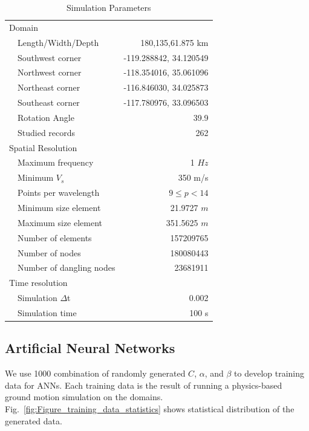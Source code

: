 \begin{table}[ht]
\centering
\caption{Simulation Parameters}
\label{tab:sim_param}
\renewcommand{\arraystretch}{0.75}
\begin{tabular}{lr}
\\ \hline
Domain                              &                              \\
~~Length/Width/Depth       & 180,135,61.875 km \\
~~Southwest corner          & -119.288842, 34.120549             \\
~~Northwest corner           & -118.354016, 35.061096             \\
~~Northeast corner            & -116.846030, 34.025873              \\
~~Southeast corner           & -117.780976, 33.096503               \\
~~Rotation Angle               & 39.9 \\
~~Studied records             & 262 \\
Spatial Resolution              &    \\
~~Maximum frequency     & 1 $Hz$ \\
~~Minimum $V_s$            & 350 m/s \\
~~Points per wavelength   & $9\leq p < 14$\\
~~Minimum size element   & 21.9727 $m$\\
~~Maximum size element   & 351.5625 $m$\\
~~Number of elements       & 157209765 \\
~~Number of nodes            & 180080443 \\
~~Number of dangling nodes & 23681911 \\
Time resolution  & \\
~~Simulation $\Delta$t & 0.002 \\
~~Simulation time & 100 s\\ \hline
\end{tabular}
\end{table}

\subsection{Artificial Neural Networks}

We use 1000 combination of randomly generated $C$, $\alpha$, and $\beta$ to develop training data for ANNs. Each training data is the result of running a physics-based ground motion simulation on the domains. Fig.~\ref{fig:Figure_training_data_statistics} shows statistical distribution of the generated data.

